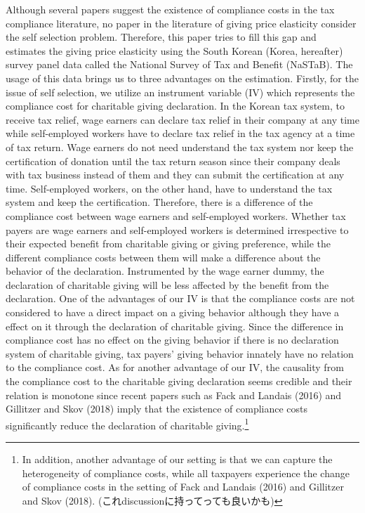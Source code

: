 \documentclass[
  11pt,
  a4paper,
]{article}
\begin{document}
Although several papers suggest
the existence of compliance costs in the tax compliance literature,
no paper in the literature of giving price elasticity consider the self selection problem.
Therefore, this paper tries to fill this gap and
estimates the giving price elasticity
using the South Korean (Korea, hereafter) survey panel data
called the National Survey of Tax and Benefit (NaSTaB).
The usage of this data brings us to three advantages on the estimation.
Firstly, for the issue of self selection,
we utilize an instrument variable (IV)
which represents the compliance cost for charitable giving declaration.
In the Korean tax system, to receive tax relief,
wage earners can declare tax relief in their company at any time
while self-employed workers have to declare tax relief in the tax agency
at a time of tax return.
Wage earners do not need understand the tax system nor
keep the certification of donation until the tax return season
since their company deals with tax business instead of them
and they can submit the certification at any time.
Self-employed workers, on the other hand, have to understand the tax system
and keep the certification.
Therefore, there is a difference of the compliance cost
between wage earners and self-employed workers.
Whether tax payers are wage earners and self-employed workers is
determined irrespective to their expected benefit from charitable giving or giving preference,
while the different compliance costs between them will make
a difference about the behavior of the declaration.
Instrumented by the wage earner dummy,
the declaration of charitable giving will be less affected
by the benefit from the declaration.
One of the advantages of our IV is that
the compliance costs are not considered to have a direct impact on a giving behavior
although they have a effect on it through the declaration of charitable giving.
Since the difference in compliance cost has no effect on the giving behavior
if there is no declaration system of charitable giving,
tax payers' giving behavior innately have no relation to the compliance cost.
As for another advantage of our IV,
the causality from the compliance cost to the charitable giving declaration
seems credible and their relation is monotone since recent papers
such as Fack and Landais (2016) and Gillitzer and Skov (2018) imply that the existence of compliance costs significantly reduce the declaration of charitable giving.\footnote{In addition,
  another advantage of our setting is that
  we can capture the heterogeneity of compliance costs,
  while all taxpayers experience the change of compliance costs
  in the setting of Fack and Landais (2016) and Gillitzer and Skov (2018).
  (これdiscussionに持ってっても良いかも)}
\end{document}
